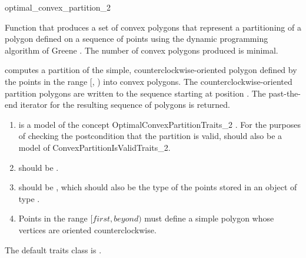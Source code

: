 \begin{ccRefFunction}{optimal_convex_partition_2}

Function that produces a set of convex polygons 
that represent a partitioning of a polygon defined on a sequence of 
points using the dynamic programming algorithm of Greene \cite{g-dpcp-83}.  
The number of convex polygons produced is minimal.



{
computes a partition of the simple, counterclockwise-oriented polygon defined
by the points in the range [, ) into convex
polygons. The counterclockwise-oriented partition polygons are written to
the sequence starting at position .  The past-the-end iterator for
the resulting sequence of polygons is returned.
}

\begin{enumerate}
    \item {} is a model of the concept OptimalConvexPartitionTraits\_2%
          .
          For the purposes of checking the
          postcondition that the partition is valid,  should
          also be a model of ConvexPartitionIsValidTraits\_2.
    \item {} should be
          .
    \item {} should be ,
          which should also be the type of the points stored in an object
          of type .
    \item Points in the range $[first, beyond)$ must define a simple polygon
          whose vertices are oriented counterclockwise.
\end{enumerate}

The default traits class  is . 


\end{ccRefFunction}
